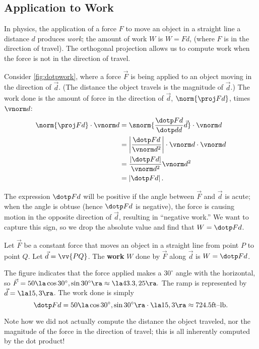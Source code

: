 \subsection*{Application to Work}

In physics, the application of a force $F$ to move an object in a straight line a distance $d$ produces \emph{work}; the amount of work $W$ is $W=Fd$, (where $F$ is in the direction of travel). The orthogonal projection allows us to compute work when the force is not in the direction of travel.

Consider \autoref{fig:dotpwork}, where a force $\vec F$ is being applied to an object moving in the direction of $\vec d$. (The distance the object travels is the magnitude of $\vec d$.) The work done is the amount of force in the direction of $\vec d$, $\norm{\proj Fd}$, times $\vnorm d$:
\begin{align*}
\norm{\proj Fd}\cdot\vnorm d &= \snorm{\frac{\dotp Fd}{\dotp dd}\vec d}\cdot \vnorm d \\
		&= \left|\frac{\dotp Fd}{\vnorm d^2}\right|\cdot \vnorm d\cdot\vnorm d\\
		&= \frac{\left|\dotp Fd\right|}{\vnorm d^2}\vnorm d^2\\
		&= \left|\dotp Fd\right|.
\end{align*}

The expression $\dotp Fd$ will be positive if the angle between $\vec F$ and $\vec d$ is acute; when the angle is obtuse (hence $\dotp Fd$ is negative), the force is causing motion in the opposite direction of $\vec d$, resulting in ``negative work.'' We want to capture this sign, so we drop the absolute value and find that $W = \dotp Fd$.

{Let $\vec F$ be a constant force that moves an object in a straight line from point $P$ to point $Q$. Let $\vec d = \vv{PQ}$. The \textbf{work} $W$ done by $\vec F$ along $\vec d$ is $W = \dotp Fd$.
}

{The figure indicates that the force applied makes a $30^\circ$ angle with the horizontal, so $\vec F = 50\la \cos 30^\circ,\sin 30^\circ\ra \approx \la 43.3,25\ra.$ The ramp is represented by $\vec d  = \la 15,3\ra$. The work done is simply
$$\dotp Fd = 50\la \cos 30^\circ,\sin 30^\circ\ra \cdot \la 15,3\ra \approx 724.5 \text{ft--lb}.$$

Note how we did not actually compute the distance the object traveled, nor the magnitude of the force in the direction of travel; this is all inherently computed by the dot product!}

